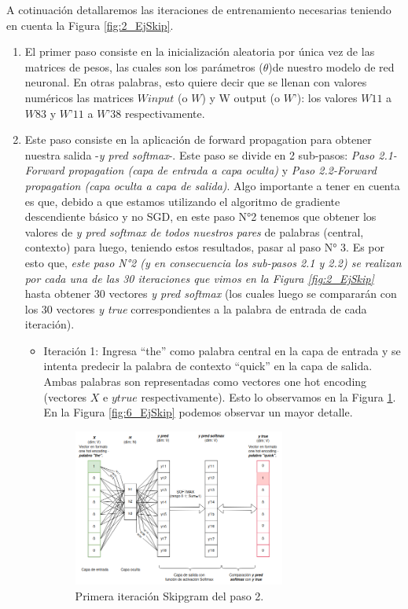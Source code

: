 \documentclass[12pt,a4paper]{article}
\begin{document}
\begin{sloppypar}
A cotinuación detallaremos las iteraciones de entrenamiento necesarias teniendo en cuenta la Figura \ref{fig:2_EjSkip}. 

\begin{enumerate}
      
\item El primer paso consiste en la inicialización aleatoria por única vez de las matrices de pesos, las cuales son los parámetros ($\theta$)de nuestro modelo de red neuronal. En otras palabras, esto quiere decir que se llenan con valores numéricos las matrices $W input$ (o $W$) y W output (o $W’$): los valores $W11$ a $W83$ y $W’11$ a $W’38$ respectivamente.
\item Este paso consiste en la aplicación de forward propagation para obtener nuestra salida -\textit{y pred softmax}-. Este paso se divide en 2 sub-pasos: \textit{Paso 2.1-Forward propagation (capa de entrada a capa oculta)} y \textit{Paso 2.2-Forward propagation (capa oculta a capa de salida)}.
Algo importante a tener en cuenta es que, debido a que estamos utilizando el algoritmo de gradiente descendiente básico y no SGD, en este paso N°2 tenemos que obtener los valores de \textit{y pred softmax de todos nuestros pares} de palabras (central, contexto) para luego, teniendo estos resultados, pasar al paso N° 3. Es por esto que, \textit{este paso N°2 (y en consecuencia los sub-pasos 2.1 y 2.2) se realizan por cada una de las 30 iteraciones que vimos en la Figura \ref{fig:2_EjSkip} } hasta obtener 30 vectores \textit{y pred softmax} (los cuales luego se compararán con los 30 vectores \textit{y true} correspondientes a la palabra de entrada de cada iteración).
      \begin{itemize}
      
      \item Iteración 1: Ingresa “the” como palabra central en la capa de entrada y se intenta predecir la palabra de contexto “quick” en la capa de salida. Ambas palabras son representadas como vectores one hot encoding (vectores $X$ e $y true$ respectivamente). Esto lo observamos en la Figura \ref{fig:5_EjSkip}. En la Figura \ref{fig:6_EjSkip} podemos observar un mayor detalle. 

\begin{figure}[H]    %
\centering
\includegraphics[width=0.7\textwidth]{images/Ejemplo_Skipgram/5_EjSkip.png}
\caption{Primera iteración Skipgram del paso 2.} 
\label{fig:5_EjSkip}
\end{figure}


\end{itemize}
\end{enumerate}
\end{sloppypar}
\end{document}
